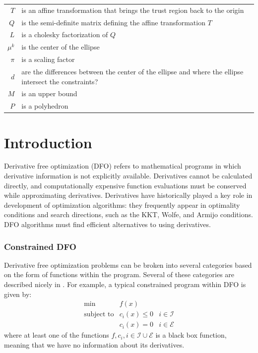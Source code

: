 \documentclass{article}
\begin{document}
\begin{table}
\begin{center}
\begin{tabular}{r p{10cm} }
$T$ & is an affine transformation that brings the trust region back to the origin \\
$Q$ & is the semi-definite matrix defining the affine transformation $T$ \\
$L$ & is a cholesky factorization of $Q$ \\
$\mu^k$ & is the center of the ellipse \\
$\pi$ & is a scaling factor \\
$d$ & are the differences between the center of the ellipse and where the ellipse intersect the constraints? \\
$M$ & is an upper bound \\
$P$ & is a polyhedron \\
\end{tabular}
\end{center}
\label{tab:TableOfNotation}
\end{table}




\section{Introduction}

Derivative free optimization (DFO) refers to mathematical programs in which derivative information is not explicitly available.
Derivatives cannot be calculated directly, and computationally expensive function evaluations must be conserved while approximating derivatives.
Derivatives have historically played a key role in development of optimization algorithms:
they frequently appear in optimality conditions and search directions, such as the KKT, Wolfe, and Armijo conditions.
DFO algorithms must find efficient alternatives to using derivatives.


\subsubsection{Constrained DFO}
Derivative free optimization problems can be broken into several categories based on the form of functions within the program.
Several of these categories are described nicely in \cite{taxonomy}.
For example, a typical constrained program within DFO is given by:
\[ \begin{array}{ccl} \min & f(x) \\
\mbox{subject to} & c_i(x) \le 0 & i \in \mathcal{I} \\
& c_i(x) = 0 & i \in \mathcal{E}
\end{array}
\]
where at least one of the functions $f, c_i, i \in \mathcal{I} \cup \mathcal{E}$ is a black box function,
meaning that we have no information about its derivatives.
\end{document}
